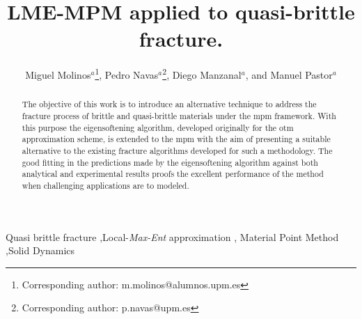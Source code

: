 \documentclass[preprint,12pt,a4paper]{elsarticle}
\begin{document}
\begin{frontmatter}

\title{LME-MPM applied to quasi-brittle fracture.}


\author{
Miguel Molinos$^a$\footnote{Corresponding author: m.molinos@alumnos.upm.es},
Pedro Navas$^a$\footnote{Corresponding author: p.navas@upm.es},
Diego Manzanal$^a$,
and Manuel Pastor$^a$
 }
 \address{
 $^a$ ETSI Caminos, Canales y Puertos, Universidad Polit\'ectnica de Madrid.\\
 c. Prof. Aranguren 3, 28040 Madrid, Spain
}

\begin{abstract}
  The objective of this work is to introduce an alternative
  technique to address the fracture process of brittle and
  quasi-brittle materials under the \acrfull{mpm} 
  framework. With this purpose the eigensoftening algorithm, developed
  originally for the \acrfull{otm} approximation scheme, is extended
  to the \acrshort{mpm} with the aim of presenting a suitable alternative
  to the existing fracture algorithms developed for such a methodology.
  The good fitting in the predictions made by the
  eigensoftening algorithm against both analytical and experimental
  results proofs the excellent performance of the method when challenging
  applications are to modeled.
\end{abstract}

\begin{keyword}
Quasi brittle fracture \sep Local-\textit{Max-Ent} approximation \sep
Material Point Method \sep Solid Dynamics
\end{keyword}

\end{frontmatter}

\linenumbers

\end{document}
